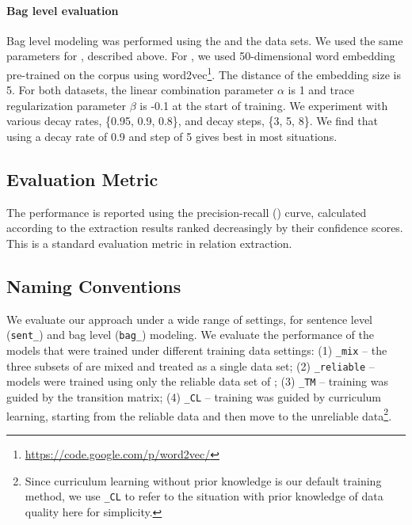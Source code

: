 \paragraph{Bag level evaluation}
Bag level modeling was performed using the \TimeRE and the \EntityRE data sets. We used the same parameters for \TimeRE, described above. 
For \EntityRE, we used 50-dimensional word embedding pre-trained on the \NYT corpus using word2vec\footnote{\url{ https://code.google.com/p/word2vec/}}. The distance of the embedding size is 5. For both datasets, the linear combination parameter $\alpha$ is 1 and trace regularization parameter $\beta$ is -0.1 at the start of training. We experiment with various decay rates, \{0.95, 0.9, 0.8\}, and decay steps, \{3, 5, 8\}. We find that using a decay rate of 0.9 and step of 5 gives best in most situations.

\subsection{Evaluation Metric}
The performance is reported using the precision-recall (\PR) curve, calculated according to the extraction results ranked decreasingly by their confidence scores. This is a standard evaluation metric in relation extraction.

\subsection{Naming Conventions}
We evaluate our approach under a wide range of settings, for  
 sentence level
(\texttt{sent\_}) and bag level (\texttt{bag\_}) modeling. 
We evaluate the performance of the models that were trained under different training data settings: 
(1) \texttt{\_mix} -- the three subsets of \TimeRE are mixed and treated as a single data set;
(2) \texttt{\_reliable} -- models were trained using only the reliable 
data set of \TimeRE;
(3) \texttt{\_TM} -- training was guided by the transition matrix;
(4) \texttt{\_CL} -- training was guided by curriculum learning, starting from
the reliable data and then move to the unreliable data\footnote{Since curriculum learning without prior knowledge is our default training method, we use \texttt{\_CL} to refer to the situation with prior knowledge of data quality here for simplicity. }.

